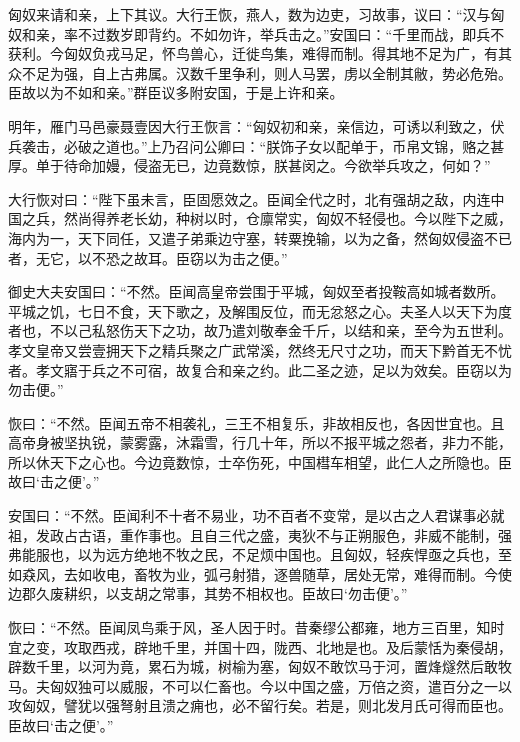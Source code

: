 \documentclass[12pt,UTF8]{ctexbook}
\begin{document}
匈奴来请和亲，上下其议。大行王恢，燕人，数为边吏，习故事，议曰：“汉与匈奴和亲，率不过数岁即背约。不如勿许，举兵击之。”安国曰：“千里而战，即兵不获利。今匈奴负戎马足，怀鸟兽心，迁徙鸟集，难得而制。得其地不足为广，有其众不足为强，自上古弗属。汉数千里争利，则人马罢，虏以全制其敝，势必危殆。臣故以为不如和亲。”群臣议多附安国，于是上许和亲。



明年，雁门马邑豪聂壹因大行王恢言：“匈奴初和亲，亲信边，可诱以利致之，伏兵袭击，必破之道也。”上乃召问公卿曰：“朕饰子女以配单于，币帛文锦，赂之甚厚。单于待命加嫚，侵盗无已，边竟数惊，朕甚闵之。今欲举兵攻之，何如？”



大行恢对曰：“陛下虽未言，臣固愿效之。臣闻全代之时，北有强胡之敌，内连中国之兵，然尚得养老长幼，种树以时，仓廪常实，匈奴不轻侵也。今以陛下之威，海内为一，天下同任，又遣子弟乘边守塞，转粟挽输，以为之备，然匈奴侵盗不已者，无它，以不恐之故耳。臣窃以为击之便。”



御史大夫安国曰：“不然。臣闻高皇帝尝围于平城，匈奴至者投鞍高如城者数所。平城之饥，七日不食，天下歌之，及解围反位，而无忿怒之心。夫圣人以天下为度者也，不以己私怒伤天下之功，故乃遣刘敬奉金千斤，以结和亲，至今为五世利。孝文皇帝又尝壹拥天下之精兵聚之广武常溪，然终无尺寸之功，而天下黔首无不忧者。孝文寤于兵之不可宿，故复合和亲之约。此二圣之迹，足以为效矣。臣窃以为勿击便。”



恢曰：“不然。臣闻五帝不相袭礼，三王不相复乐，非故相反也，各因世宜也。且高帝身被坚执锐，蒙雾露，沐霜雪，行几十年，所以不报平城之怨者，非力不能，所以休天下之心也。今边竟数惊，士卒伤死，中国槥车相望，此仁人之所隐也。臣故曰‘击之便’。”



安国曰：“不然。臣闻利不十者不易业，功不百者不变常，是以古之人君谋事必就祖，发政占古语，重作事也。且自三代之盛，夷狄不与正朔服色，非威不能制，强弗能服也，以为远方绝地不牧之民，不足烦中国也。且匈奴，轻疾悍亟之兵也，至如猋风，去如收电，畜牧为业，弧弓射猎，逐兽随草，居处无常，难得而制。今使边郡久废耕织，以支胡之常事，其势不相权也。臣故曰‘勿击便’。”



恢曰：“不然。臣闻凤鸟乘于风，圣人因于时。昔秦缪公都雍，地方三百里，知时宜之变，攻取西戎，辟地千里，并国十四，陇西、北地是也。及后蒙恬为秦侵胡，辟数千里，以河为竟，累石为城，树榆为塞，匈奴不敢饮马于河，置烽燧然后敢牧马。夫匈奴独可以威服，不可以仁畜也。今以中国之盛，万倍之资，遣百分之一以攻匈奴，譬犹以强弩射且溃之痈也，必不留行矣。若是，则北发月氏可得而臣也。臣故曰‘击之便’。”
\end{document}
